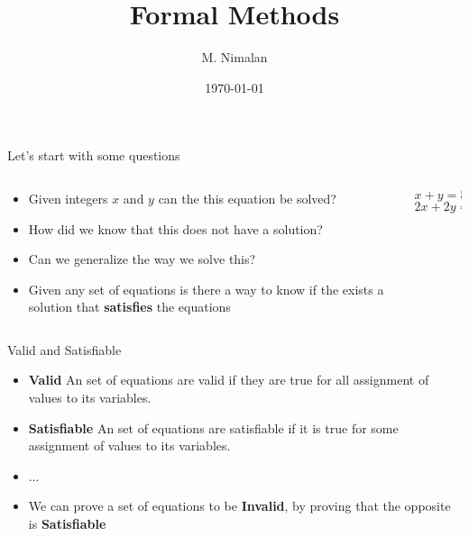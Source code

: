 \documentclass{beamer}
\title{Formal Methods}
\author{M. Nimalan}
\date{\today}
\begin{document}
\frame{\titlepage}

\begin{frame}{Let's start with some questions}
  \begin{columns}
    \begin{column}{0.5\textwidth}
      \begin{itemize}
        \item Given integers $x$ and $y$ can the this equation be solved?
        \item How did we know that this does not have a solution?
        \item Can we generalize the way we solve this?
        \item Given any set of equations is there a way to know if the exists a solution that \textbf{satisfies} the equations
      \end{itemize}
    \end{column}

    \begin{column}{0.5\textwidth}
      $$ x + y = 5 $$
      $$ 2x + 2y = 15$$
    \end{column}
  \end{columns}
\end{frame}

\begin{frame}{Valid and Satisfiable}
  \begin{itemize}
    \item \textbf{Valid} An set of equations are valid if they are true for all assignment of values to its variables.
    \item \textbf{Satisfiable} An set of equations are satisfiable if it is true for some assignment of values to its variables.
    \item ...
    \item We can prove a set of equations to be \textbf{Invalid}, by proving that the opposite is \textbf{Satisfiable}
  \end{itemize}
\end{frame}
\end{document}
